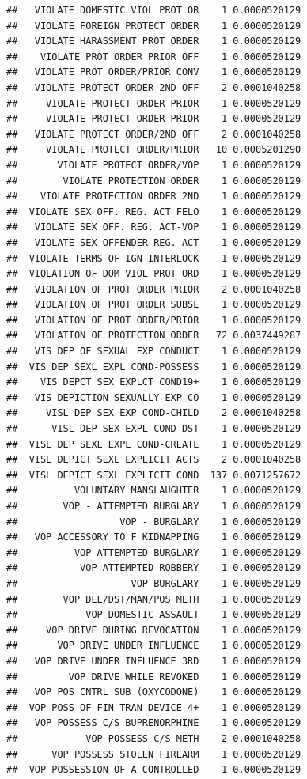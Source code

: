 \documentclass[]{book}
\begin{document}
\begin{verbatim}
##   VIOLATE DOMESTIC VIOL PROT OR    1 0.0000520129
##   VIOLATE FOREIGN PROTECT ORDER    1 0.0000520129
##   VIOLATE HARASSMENT PROT ORDER    1 0.0000520129
##    VIOLATE PROT ORDER PRIOR OFF    1 0.0000520129
##   VIOLATE PROT ORDER/PRIOR CONV    1 0.0000520129
##   VIOLATE PROTECT ORDER 2ND OFF    2 0.0001040258
##     VIOLATE PROTECT ORDER PRIOR    1 0.0000520129
##     VIOLATE PROTECT ORDER-PRIOR    1 0.0000520129
##   VIOLATE PROTECT ORDER/2ND OFF    2 0.0001040258
##     VIOLATE PROTECT ORDER/PRIOR   10 0.0005201290
##       VIOLATE PROTECT ORDER/VOP    1 0.0000520129
##        VIOLATE PROTECTION ORDER    1 0.0000520129
##    VIOLATE PROTECTION ORDER 2ND    1 0.0000520129
##  VIOLATE SEX OFF. REG. ACT FELO    1 0.0000520129
##   VIOLATE SEX OFF. REG. ACT-VOP    1 0.0000520129
##   VIOLATE SEX OFFENDER REG. ACT    1 0.0000520129
##  VIOLATE TERMS OF IGN INTERLOCK    1 0.0000520129
##  VIOLATION OF DOM VIOL PROT ORD    1 0.0000520129
##   VIOLATION OF PROT ORDER PRIOR    2 0.0001040258
##   VIOLATION OF PROT ORDER SUBSE    1 0.0000520129
##   VIOLATION OF PROT ORDER/PRIOR    1 0.0000520129
##   VIOLATION OF PROTECTION ORDER   72 0.0037449287
##   VIS DEP OF SEXUAL EXP CONDUCT    1 0.0000520129
##  VIS DEP SEXL EXPL COND-POSSESS    1 0.0000520129
##    VIS DEPCT SEX EXPLCT COND19+    1 0.0000520129
##   VIS DEPICTION SEXUALLY EXP CO    1 0.0000520129
##     VISL DEP SEX EXP COND-CHILD    2 0.0001040258
##      VISL DEP SEX EXPL COND-DST    1 0.0000520129
##  VISL DEP SEXL EXPL COND-CREATE    1 0.0000520129
##  VISL DEPICT SEXL EXPLICIT ACTS    2 0.0001040258
##  VISL DEPICT SEXL EXPLICIT COND  137 0.0071257672
##          VOLUNTARY MANSLAUGHTER    1 0.0000520129
##        VOP - ATTEMPTED BURGLARY    1 0.0000520129
##                  VOP - BURGLARY    1 0.0000520129
##   VOP ACCESSORY TO F KIDNAPPING    1 0.0000520129
##          VOP ATTEMPTED BURGLARY    1 0.0000520129
##           VOP ATTEMPTED ROBBERY    1 0.0000520129
##                    VOP BURGLARY    1 0.0000520129
##        VOP DEL/DST/MAN/POS METH    1 0.0000520129
##            VOP DOMESTIC ASSAULT    1 0.0000520129
##     VOP DRIVE DURING REVOCATION    1 0.0000520129
##       VOP DRIVE UNDER INFLUENCE    1 0.0000520129
##   VOP DRIVE UNDER INFLUENCE 3RD    1 0.0000520129
##         VOP DRIVE WHILE REVOKED    1 0.0000520129
##   VOP POS CNTRL SUB (OXYCODONE)    1 0.0000520129
##  VOP POSS OF FIN TRAN DEVICE 4+    1 0.0000520129
##   VOP POSSESS C/S BUPRENORPHINE    1 0.0000520129
##            VOP POSSESS C/S METH    2 0.0001040258
##      VOP POSSESS STOLEN FIREARM    1 0.0000520129
##  VOP POSSESSION OF A CONTROLLED    1 0.0000520129

\end{verbatim}
\end{document}

